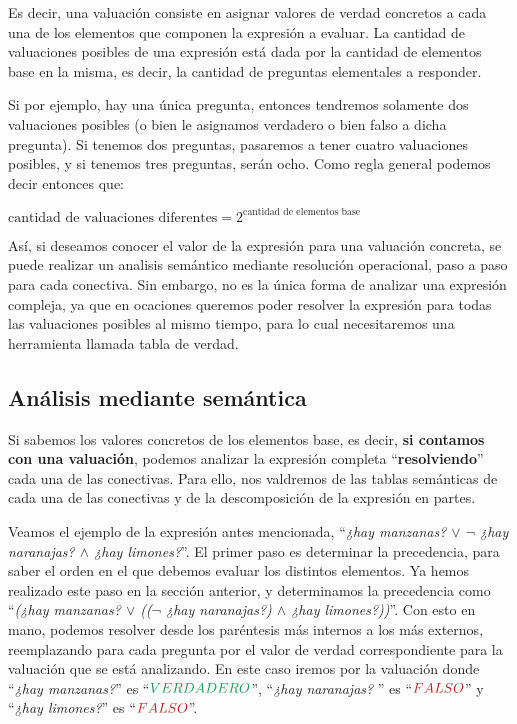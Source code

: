 Es decir, una valuación consiste en asignar valores de verdad concretos a cada
una de los elementos que componen la expresión a evaluar. La cantidad de
valuaciones posibles de una expresión está dada por la cantidad de elementos
base en la misma, es decir, la cantidad de preguntas elementales a responder.

Si por ejemplo, hay una única pregunta, entonces tendremos solamente dos
valuaciones posibles (o bien le asignamos verdadero o bien falso a dicha
pregunta). Si tenemos dos preguntas, pasaremos a tener cuatro valuaciones
posibles, y si tenemos tres preguntas, serán ocho. Como regla general podemos
decir entonces que:

\begin{corollary}
    $\text{cantidad de valuaciones diferentes} = 2^\text{cantidad de elementos
    base}$
\end{corollary}

Así, si deseamos conocer el valor de la expresión para una valuación concreta,
se puede realizar un analisis semántico mediante resolución operacional, paso a
paso para cada conectiva. Sin embargo, no es la única forma de analizar una
expresión compleja, ya que en ocaciones queremos poder resolver la expresión
para todas las valuaciones posibles al mismo tiempo, para lo cual necesitaremos
una herramienta llamada tabla de verdad.

\subsection{Análisis mediante semántica}
\label{chap:logica:subsec:analisis_semantico}

Si sabemos los valores concretos de los elementos base, es decir, \textbf{si
contamos con una valuación}, podemos analizar la expresión completa
``\textbf{resolviendo}'' cada una de las conectivas. Para ello, nos valdremos de
las tablas semánticas de cada una de las conectivas y de la descomposición de la
expresión en partes.

Veamos el ejemplo de la expresión antes mencionada, ``\textit{¿hay manzanas?
$\lor$ $\lnot$ ¿hay naranajas? $\land$ ¿hay limones?}''. El primer paso es
determinar la precedencia, para saber el orden en el que debemos evaluar los
distintos elementos. Ya hemos realizado este paso en la sección anterior, y
determinamos la precedencia como ``\textit{(¿hay manzanas? $\lor$ (($\lnot$ ¿hay
naranajas?) $\land$ ¿hay limones?))}''. Con esto en mano, podemos resolver desde
los paréntesis más internos a los más externos, reemplazando para cada pregunta
por el valor de verdad correspondiente para la valuación que se está analizando.
En este caso iremos por la valuación donde ``\textit{¿hay manzanas?}'' es
``$\ltruefull$'', ``\textit{¿hay naranajas?} '' es ``$\lfalsefull$'' y
``\textit{¿hay limones?}'' es ``$\lfalsefull$''.


